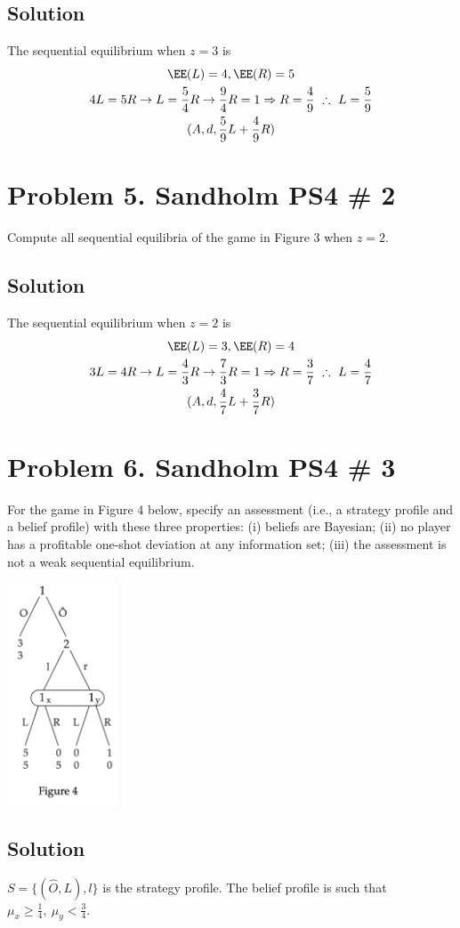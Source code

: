 \documentclass[10pt, a4paper]{article}
\begin{document}
  \subsection*{Solution}
    The sequential equilibrium when $z=3$ is 
    \begin{gather*}
      \EE(L) = 4, \EE(R) = 5\\
      4L = 5R \rightarrow L = \frac{5}{4}R \rightarrow \frac{9}{4}R = 1 \Rightarrow R = \frac{4}{9} \ \therefore \ L = \frac{5}{9} \\
      (A, d, \frac{5}{9}L + \frac{4}{9}R)
    \end{gather*}
\section*{Problem 5. Sandholm PS4 \# 2}
  Compute all sequential equilibria of the game in Figure 3 when $z=2$.
  \subsection*{Solution}
    The sequential equilibrium when $z=2$ is 
    \begin{gather*}
      \EE(L) = 3, \EE(R) = 4 \\
      3L = 4R \rightarrow L = \frac{4}{3}R \rightarrow \frac{7}{3}R = 1 \Rightarrow R = \frac{3}{7} \ \therefore \ L = \frac{4}{7} \\
      (A, d, \frac{4}{7}L + \frac{3}{7}R)
    \end{gather*}
\section*{Problem 6. Sandholm PS4 \# 3}
  For the game in Figure 4 below, specify an assessment (i.e., a strategy profile and a belief profile) with these three properties: (i) beliefs are Bayesian; (ii) no player has a profitable one-shot deviation at any information set; (iii) the assessment is not a weak sequential equilibrium.
  \begin{center}
    \includegraphics[width = 0.25\textwidth]{fig4.png}
  \end{center}
  \subsection*{Solution}
    $S = \{(\hat{O}, L), l\}$ is the strategy profile. The belief profile is such that $\mu_x \geq \frac{1}{4}, \ \mu_y < \frac{3}{4}$. 
\end{document}
